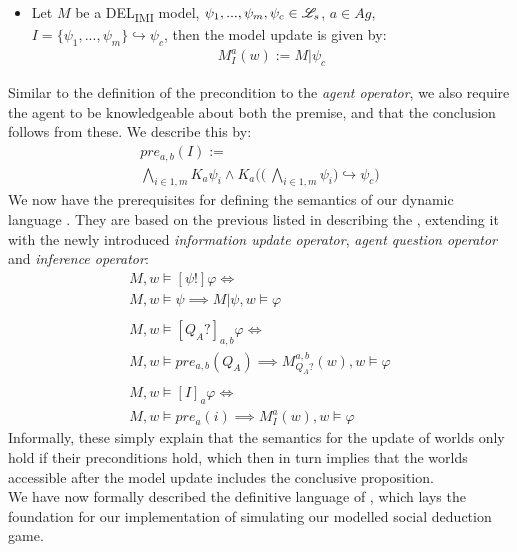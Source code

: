 \begin{itemize}
    \item Let $M$ be a DEL\textsubscript{IMI} model, $\psi_1,...,\psi_m, \psi_c \in \mathscr{L}_s$,
          $a\in Ag$, $I=\{\psi_1,...,\psi_m\} \hookrightarrow \psi_c$, then the model
          update is given by:
          \begin{gather}
              M^a_I(w) := M|\psi_c
          \end{gather}
\end{itemize}
Similar to the definition of the precondition to the \textit{agent operator}, we also require the agent to be knowledgeable about both the premise, and that the conclusion follows from these. We describe this by:
\begin{gather}
    \nonumber pre_{a,b}(I) := \\ \bigwedge\limits_{i\in1,m}K_a\psi_i \land K_a\Biggl(\Biggl(\:\bigwedge\limits_{i\in 1,m}\psi_i\Biggr) \hookrightarrow \psi_c \Biggr)
\end{gather}
We now have the prerequisites for defining the semantics of our dynamic language \dynlang. They are based on the previous listed in  describing the \staticlang, extending it with the newly introduced \textit{information update operator}, \textit{agent question operator} and \textit{inference operator}:
\begin{equation}
    \begin{gathered}
        M, w \models [\psi!]\varphi \iff \\
        M, w \models \psi \implies M|\psi, w \models \varphi \\\\
        M, w \models [Q_A?]_{a,b}\varphi \iff \\
        M, w \models pre_{a,b}(Q_A) \implies M^{a,b}_{Q_A?}(w), w \models \varphi
        \\\\
        M, w \models [I]_a\varphi \iff \\
        M, w \models pre_a(i) \implies M^a_I(w), w \models \varphi
    \end{gathered}
\end{equation}
Informally, these simply explain that the semantics for the update of worlds only hold if their preconditions hold, which then in turn implies that the worlds accessible after the model update includes the conclusive proposition. \\

We have now formally described the definitive language of \dynlang, which lays
the foundation for our implementation of simulating our modelled social
deduction game.